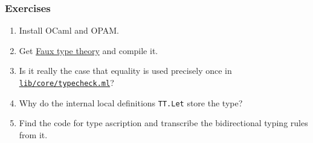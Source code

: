 \documentclass[10pt,aspectratio=169]{beamer}
\newcommand{\codeRef}[1]{\href{https://github.com/andrejbauer/faux-type-theory/blob/main/monadic-fauxtt/#1}{\texttt{#1}}}
\begin{document}
\begin{frame}
  \frametitle{Exercises}

  \begin{enumerate}
  \item Install OCaml and OPAM.
  \item Get \href{https://github.com/andrejbauer/faux-type-theory/tree/main}{Faux type theory} and compile it.
  \item Is it really the case that equality is used precisely once in \codeRef{lib/core/typecheck.ml}?
  \item Why do the internal local definitions \lstinline{TT.Let} store the type?
  \item Find the code for type ascription and transcribe the bidirectional typing rules from it.
  \end{enumerate}
\end{frame}
\end{document}
